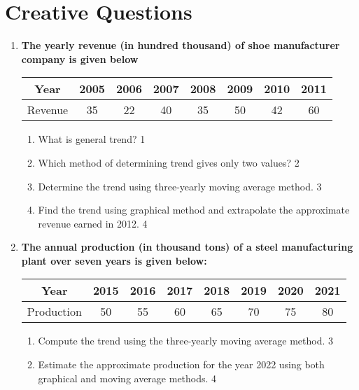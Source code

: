 \documentclass[a4paper,oneside]{book}
\begin{document}
\section{Creative Questions}
  \begin{enumerate}

   \item
	  \textbf{The yearly revenue (in hundred thousand) of shoe manufacturer company is given below} 
  \begin{table}[h]
\centering
\begin{tabular}{cccccccc}
Year     & 2005 & 2006 & 2007 & 2008 & 2009 & 2010 & 2011 \\ \hline
Revenue & 35   & 22    & 40     & 35     & 50     & 42 & 60   
\end{tabular}
\end{table}
  
  \begin{enumerate}
    \item
	What is general trend? \hfill 1
    \item
	Which method of determining trend gives only two values? \hfill 2
    \item  
	Determine the trend using three-yearly moving average method. \hfill 3
    \item
	Find the trend using graphical method and extrapolate the approximate revenue earned in 2012. \hfill 4
  \end{enumerate}
  
  \item
\textbf{The annual production (in thousand tons) of a steel manufacturing plant over seven years is given below:}

\begin{table}[h]
\centering
\begin{tabular}{cccccccc}
Year     & 2015 & 2016 & 2017 & 2018 & 2019 & 2020 & 2021 \\ \hline
Production & 50   & 55   & 60   & 65   & 70   & 75   & 80   
\end{tabular}
\end{table}

\begin{enumerate}
    \item  
    Compute the trend using the three-yearly moving average method. \hfill 3
    \item
    Estimate the approximate production for the year 2022 using both graphical and moving average methods. \hfill 4
\end{enumerate}


\end{enumerate}
\end{document}
